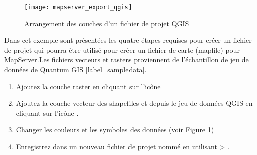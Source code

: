 \begin{figure}[ht]
\centering
  \texttt{[image: mapserver\_export\_qgis]}
   \caption{Arrangement des couches d'un fichier de projet QGIS \nixcaption}
  \label{fig:mapserver_export_qgs}
\end{figure}
Dans cet exemple sont présentées les quatre étapes requises pour créer un fichier de projet qui pourra être utilisé pour créer un fichier de carte (mapfile) pour MapServer.Les fichiers vecteurs et rasters proviennent de l'échantillon de jeu de données de Quantum GIS \ref{label_sampledata}.


\begin{enumerate}
\item Ajoutez la couche raster  en cliquant sur l'icône\\ 
\item Ajoutez la couche vecteur des shapefiles  et  depuis le jeu de données QGIS en cliquant sur l'icône .
\item Changer les couleurs et les symboles des données (voir Figure \ref{fig:mapserver_export_qgs})
\item Enregistrez dans un nouveau fichier de projet nommé  en utilisant  > .
\end{enumerate} 


